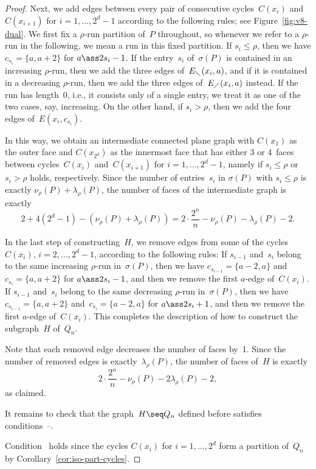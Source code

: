 \documentclass[a4paper,11pt,reqno]{amsart}
\begin{document}
\begin{proof}
Next, we add edges between every pair of consecutive cycles~$C(x_i)$ and~$C(x_{i+1})$ for $i=1,\ldots,2^d-1$ according to the following rules; see Figure~\ref{fig:v8-dual}.
We first fix a $\rho$-run partition of~$P$ throughout, so whenever we refer to a $\rho$-run in the following, we mean a run in this fixed partition.
If $s_i\leq \rho$, then we have $c_{s_i}=\{a,a+2\}$ for $a\ass 2s_i-1$.
If the entry~$s_i$ of~$\sigma(P)$ is contained in an increasing $\rho$-run, then we add the three edges of~$E_{\diagdown}(x_i,a)$, and if it is contained in a decreasing $\rho$-run, then we add the three edges of~$E_{\diagup}(x_i,a)$ instead.
If the run has length~0, i.e., it consists only of a single entry, we treat it as one of the two cases, say, increasing.
On the other hand, if $s_i>\rho$, then we add the four edges of~$E(x_i,c_{s_i})$.

In this way, we obtain an intermediate connected plane graph with $C(x_1)$ as the outer face and $C(x_{2^d})$ as the innermost face that has either 3 or 4~faces between cycles~$C(x_i)$ and~$C(x_{i+1})$ for $i=1,\dots,2^d-1$, namely if $s_i \leq \rho$ or $s_i>\rho$ holds, respectively.
Since the number of entries~$s_i$ in $\sigma(P)$ with $s_i\leq \rho$ is exactly $\nu_\rho(P)+\lambda_\rho(P)$, the number of faces of the intermediate graph is exactly
\[ 2+4(2^d-1)-(\nu_\rho(P)+\lambda_\rho(P))=2\cdot \frac{2^n}{n}-\nu_\rho(P)-\lambda_\rho(P)-2. \]

In the last step of constructing~$H$, we remove edges from some of the cycles~$C(x_i)$, $i=2,\ldots,2^d-1$, according to the following rules:
If $s_{i-1}$ and~$s_i$ belong to the same increasing $\rho$-run in~$\sigma(P)$, then we have $c_{s_{i-1}}=\{a-2,a\}$ and~$c_{s_i}=\{a,a+2\}$ for $a\ass 2s_i-1$, and then we remove the first $a$-edge of~$C(x_i)$.
If $s_{i-1}$ and~$s_i$ belong to the same decreasing $\rho$-run in~$\sigma(P)$, then we have $c_{s_{i-1}}=\{a,a+2\}$ and~$c_{s_i}=\{a-2,a\}$ for $a\ass 2s_i+1$, and then we remove the first $a$-edge of~$C(x_i)$.
This completes the description of how to construct the subgraph~$H$ of~$Q_n$.

Note that each removed edge decreases the number of faces by~1.
Since the number of removed edges is exactly~$\lambda_\rho(P)$, the number of faces of~$H$ is exactly
\[ 2\cdot\frac{2^n}{n}-\nu_\rho(P)-2\lambda_\rho(P)-2, \]
as claimed.

It remains to check that the graph~$H\seq Q_n$ defined before satisfies conditions~--.

Condition~ holds since the cycles $C(x_i)$ for $i=1,\dots,2^d$ form a partition of~$Q_n$ by Corollary~\ref{cor:iso-part-cycles}.


\end{proof}
\end{document}
